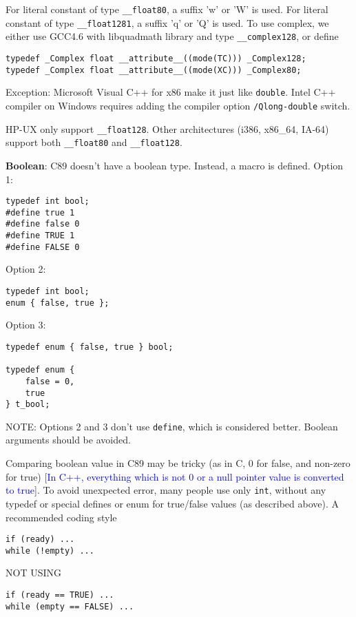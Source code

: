 \begin{enumerate}
  
  For literal constant of type \verb!__float80!, a suffix 'w' or 'W' is used.
  For literal constant of type \verb!__float1281!, a suffix 'q' or 'Q' is used.
  To use complex, we either use GCC4.6 with libquadmath library and type
  \verb!__complex128!, or define
  \begin{verbatim}
typedef _Complex float __attribute__((mode(TC))) _Complex128;
typedef _Complex float __attribute__((mode(XC))) _Complex80;
  \end{verbatim}
  
  Exception: Microsoft Visual C++ for x86 make it just like \verb!double!. Intel
  C++ compiler on Windows requires adding the compiler option
  \verb!/Qlong-double! switch.
  
\begin{mdframed}
HP-UX only support \verb!__float128!. Other architectures (i386, x86\_64, IA-64)
support both \verb!__float80! and \verb!__float128!.
\end{mdframed}  
\end{enumerate}

{\bf Boolean}: C89 doesn't have a boolean type. Instead, a macro is defined.
Option 1: 
\begin{lstlisting}
typedef int bool;
#define true 1
#define false 0
#define TRUE 1
#define FALSE 0
\end{lstlisting}
Option 2:
\begin{lstlisting}
typedef int bool;
enum { false, true };
\end{lstlisting}
Option 3:
\begin{lstlisting}
typedef enum { false, true } bool;

typedef enum {
    false = 0,
    true
} t_bool;
\end{lstlisting}
NOTE: Options 2 and 3 don't use \verb!define!, which is considered better.
Boolean arguments should be avoided.

Comparing boolean value in C89 may be tricky (as in C, 0 for false, and non-zero
for true) [\textcolor{blue}{In C++, everything which is not 0 or a null pointer
value is converted to true}]. To avoid unexpected error, many people use only
\verb!int!, without any typedef or special defines or enum for true/false values
(as described above). A recommended coding style
\begin{lstlisting}
if (ready) ...
while (!empty) ...
\end{lstlisting}
NOT USING 
\begin{lstlisting}
if (ready == TRUE) ...
while (empty == FALSE) ...
\end{lstlisting}
 
